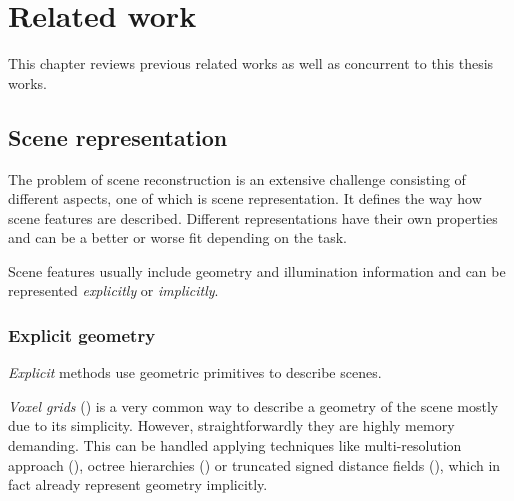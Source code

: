 \chapter{Related work}
\label{chap:related_work}


This chapter reviews previous related works as well as concurrent to this thesis works.




\section{Scene representation}

The problem of scene reconstruction is an extensive challenge consisting of different aspects,
one of which is scene representation.
It defines the way how scene features are described.
Different representations have their own properties and can be a better or worse fit depending on the task.

Scene features usually include geometry and illumination information
and can be represented \textit{explicitly} or \textit{implicitly}.

\subsection{Explicit geometry}

\textit{Explicit} methods use geometric primitives to describe scenes.

\textit{Voxel grids} (\cite{Lombardi_2019}) is a very common way to describe a geometry of the scene mostly due to its simplicity.
However, straightforwardly they are highly memory demanding.
This can be handled applying techniques like multi-resolution approach (\cite{häne2017hierarchical}), octree hierarchies (\cite{riegler2017octnet, tatarchenko2017octree})
or truncated signed distance fields (\cite{truncdistfield1996curless}),
which in fact already represent geometry implicitly.

